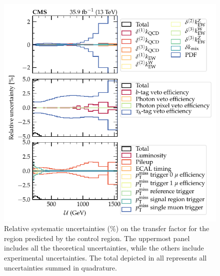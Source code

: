 \begin{figure}
    \centering
    \includegraphics{chapters/042_backgrounds/images/tf_wj_ele_met_systs1.pdf}
    \caption[Theoretical uncertainty on the transfer factors]{
        Relative systematic uncertainties (\%) on the \IWj transfer factor for the \metplusjets region predicted by the \muplusjets control region. The uppermost panel includes all the theoretical uncertainties, while the others include experimental uncertainties. The total depicted in all represents all uncertainties summed in quadrature.
    }
    \label{fig:tf-systs-eleplusjets-1}
\end{figure}
%
